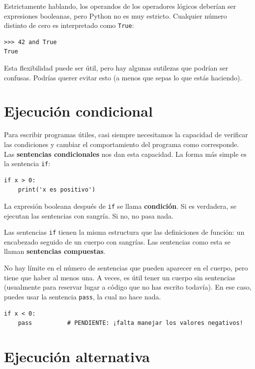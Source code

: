 \documentclass[10pt]{book}
\begin{document}
Estrictamente hablando, los operandos de los operadores lógicos deberían ser
expresiones booleanas, pero Python no es muy estricto.
Cualquier número distinto de cero es interpretado como {\tt True}:

\begin{verbatim}
>>> 42 and True
True
\end{verbatim}
%
Esta flexibilidad puede ser útil, pero hay algunas sutilezas
que podrían ser confusas.  Podrías querer evitar esto (a menos que
sepas lo que estás haciendo).


\section{Ejecución condicional}
\label{conditional.execution}

Para escribir programas útiles, casi siempre necesitamos la capacidad
de verificar las condiciones y cambiar el comportamiento del programa
como corresponde.  Las {\bf sentencias condicionales} nos dan esta capacidad.  La
forma más simple es la sentencia {\tt if}:

\begin{verbatim}
if x > 0:
    print('x es positivo')
\end{verbatim}
%
La expresión booleana después de {\tt if} se
llama {\bf condición}.  Si es verdadera, se ejecutan las sentencias
con sangría.  Si no, no pasa nada.

Las sentencias {\tt if} tienen la misma estructura que las definiciones de función:
un encabezado seguido de un cuerpo con sangrías.  Las sentencias como esta se
llaman {\bf sentencias compuestas}.

No hay límite en el número de sentencias que pueden aparecer en
el cuerpo, pero tiene que haber al menos una.
A veces, es útil tener un cuerpo sin sentencias (usualmente
para reservar lugar a código que no has escrito todavía).  En ese
caso, puedes usar la sentencia {\tt pass}, la cual no hace nada.

\begin{verbatim}
if x < 0:
    pass          # PENDIENTE: ¡falta manejar los valores negativos!
\end{verbatim}
%

\section{Ejecución alternativa}
\label{alternative.execution}
\end{document}
